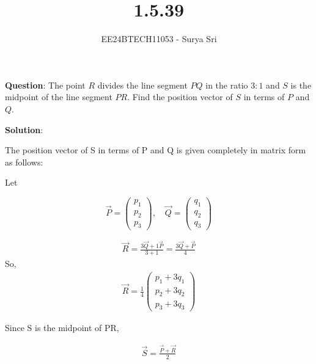 \documentclass[journal]{IEEEtran}
\begin{document}

\vspace{3cm}

\title{1.5.39}
\author{EE24BTECH11053 - Surya Sri}
{\let\newpage\relax\maketitle}

\renewcommand{\thefigure}{\theenumi}
\renewcommand{\thetable}{\theenumi}
\setlength{\intextsep}{10pt} %

\textbf{Question}:
The point $R$ divides the line segment $PQ$ in the ratio $3:1$ and $S$ is the midpoint of the line segment $PR$. Find the position vector of $S$ in terms of $P$ and $Q$.

\bigskip


\textbf{Solution}:
 


The position vector of S in terms of P and Q is given completely in matrix form as follows:

Let

$$
\vec{P} =
\begin{pmatrix}
p_1 \\
p_2 \\
p_3
\end{pmatrix}
,
\quad
\vec{Q} =
\begin{pmatrix}
q_1 \\
q_2 \\
q_3
\end{pmatrix}
$$


\begin{align}
\vec{R} = \frac{3\vec{Q} + 1\vec{P}}{3 + 1} = \frac{3\vec{Q} + \vec{P}}{4}
\end{align}
So,
\begin{align}
\vec{R} =
\frac{1}{4}
\begin{pmatrix}
p_1 + 3q_1 \\
p_2 + 3q_2 \\
p_3 + 3q_3
\end{pmatrix}
\end{align}

Since S is the midpoint of PR,

\begin{align}
\vec{S} = \frac{\vec{P} + \vec{R}}{2}
\end{align}
\end{document}
